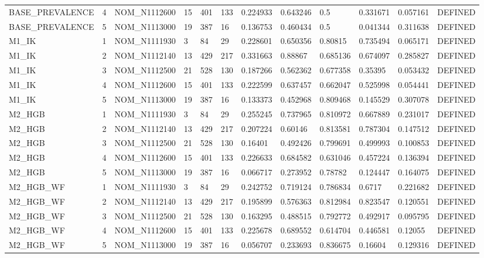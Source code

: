 \begin{table}[ht]
\begin{tabular}{llllllllllll}
BASE\_PREVALENCE & 4 & NOM\_N1112600 & 15 & 401 & 133 & 0.224933 & 0.643246 & 0.5 & 0.331671 & 0.057161 & DEFINED \\
BASE\_PREVALENCE & 5 & NOM\_N1113000 & 19 & 387 & 16 & 0.136753 & 0.460434 & 0.5 & 0.041344 & 0.311638 & DEFINED \\
M1\_IK & 1 & NOM\_N1111930 & 3 & 84 & 29 & 0.228601 & 0.650356 & 0.80815 & 0.735494 & 0.065171 & DEFINED \\
M1\_IK & 2 & NOM\_N1112140 & 13 & 429 & 217 & 0.331663 & 0.88867 & 0.685136 & 0.674097 & 0.285827 & DEFINED \\
M1\_IK & 3 & NOM\_N1112500 & 21 & 528 & 130 & 0.187266 & 0.562362 & 0.677358 & 0.35395 & 0.053432 & DEFINED \\
M1\_IK & 4 & NOM\_N1112600 & 15 & 401 & 133 & 0.222599 & 0.637457 & 0.662047 & 0.525998 & 0.054441 & DEFINED \\
M1\_IK & 5 & NOM\_N1113000 & 19 & 387 & 16 & 0.133373 & 0.452968 & 0.809468 & 0.145529 & 0.307078 & DEFINED \\
M2\_HGB & 1 & NOM\_N1111930 & 3 & 84 & 29 & 0.255245 & 0.737965 & 0.810972 & 0.667889 & 0.231017 & DEFINED \\
M2\_HGB & 2 & NOM\_N1112140 & 13 & 429 & 217 & 0.207224 & 0.60146 & 0.813581 & 0.787304 & 0.147512 & DEFINED \\
M2\_HGB & 3 & NOM\_N1112500 & 21 & 528 & 130 & 0.16401 & 0.492426 & 0.799691 & 0.499993 & 0.100853 & DEFINED \\
M2\_HGB & 4 & NOM\_N1112600 & 15 & 401 & 133 & 0.226633 & 0.684582 & 0.631046 & 0.457224 & 0.136394 & DEFINED \\
M2\_HGB & 5 & NOM\_N1113000 & 19 & 387 & 16 & 0.066717 & 0.273952 & 0.78782 & 0.124447 & 0.164075 & DEFINED \\
M2\_HGB\_WF & 1 & NOM\_N1111930 & 3 & 84 & 29 & 0.242752 & 0.719124 & 0.786834 & 0.6717 & 0.221682 & DEFINED \\
M2\_HGB\_WF & 2 & NOM\_N1112140 & 13 & 429 & 217 & 0.195899 & 0.576363 & 0.812984 & 0.823547 & 0.120551 & DEFINED \\
M2\_HGB\_WF & 3 & NOM\_N1112500 & 21 & 528 & 130 & 0.163295 & 0.488515 & 0.792772 & 0.492917 & 0.095795 & DEFINED \\
M2\_HGB\_WF & 4 & NOM\_N1112600 & 15 & 401 & 133 & 0.225678 & 0.689552 & 0.614704 & 0.446581 & 0.12055 & DEFINED \\
M2\_HGB\_WF & 5 & NOM\_N1113000 & 19 & 387 & 16 & 0.056707 & 0.233693 & 0.836675 & 0.16604 & 0.129316 & DEFINED \\

\end{tabular}
\end{table}
